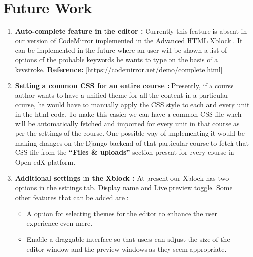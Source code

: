 \chapter {Future Work}
\begin{enumerate}
\item \textbf{Auto-complete feature in the editor :} \newline
Currently this feature is absent in our version of CodeMirror implemented in the Advanced
HTML Xblock . It can be implemented in the future where an user will be shown a list of
options of the probable keywords he wants to type on the basis of a keystroke.
\newline  \textbf{Reference:} [\url{https://codemirror.net/demo/complete.html}]
\item \textbf{Setting a common CSS for an entire course :} \newline
Presently, if a course author wants to have a unified theme for all the content in a particular
course, he would have to manually apply the CSS style to each and every unit in the html
code. To make this easier we can have a common CSS file whch will be automatically
fetched and imported for every unit in that course as per the settings of the course. One
possible way of implementing it would be making changes on the Django backend of that
particular course to fetch that CSS file from the \textbf{ “Files \& uploads”} section present for every
course in Open edX platform.
\item \textbf{Additional settings in the Xblock :}\newline
At present our Xblock has two options in the settings tab. Display name and Live preview
toggle. Some other features that can be added are :
\begin{itemize}
\item A option for selecting themes for the editor to enhance the user experience
even more.
\item Enable a draggable interface so that users can adjust the size of the editor
window and the preview windows as they seem appropriate.
\end{itemize}
\end{enumerate}